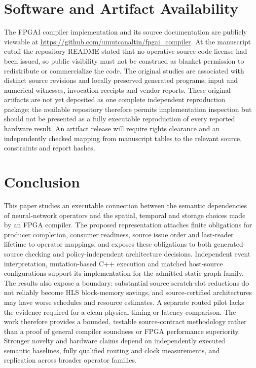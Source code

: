 \documentclass{article}
\begin{document}
\section{Software and Artifact Availability}
\label{sec:artifact}
The FPGAI compiler implementation and its source documentation are publicly viewable at \url{https://github.com/umutcanaltin/fpgai_compiler}. At the manuscript cutoff the repository README stated that no operative source-code license had been issued, so public visibility must not be construed as blanket permission to redistribute or commercialize the code. The original studies are associated with distinct source revisions and locally preserved generated programs, input and numerical witnesses, invocation receipts and vendor reports. These original artifacts are not yet deposited as one complete independent reproduction package; the available repository therefore permits implementation inspection but should not be presented as a fully executable reproduction of every reported hardware result. An artifact release will require rights clearance and an independently checked mapping from manuscript tables to the relevant source, constraints and report hashes.

\section{Conclusion}
This paper studies an executable connection between the semantic dependencies of neural-network operators and the spatial, temporal and storage choices made by an FPGA compiler. The proposed representation attaches finite obligations for producer completion, consumer readiness, source issue order and last-reader lifetime to operator mappings, and exposes these obligations to both generated-source checking and policy-independent architecture decisions. Independent event interpretation, mutation-based C++ execution and matched host-source configurations support its implementation for the admitted static graph family. The results also expose a boundary: substantial source scratch-slot reductions do not reliably become HLS block-memory savings, and source-certified architectures may have worse schedules and resource estimates. A separate routed pilot lacks the evidence required for a clean physical timing or latency comparison. The work therefore provides a bounded, testable source-contract methodology rather than a proof of general compiler soundness or FPGA performance superiority. Stronger novelty and hardware claims depend on independently executed semantic baselines, fully qualified routing and clock measurements, and replication across broader operator families.
\end{document}
